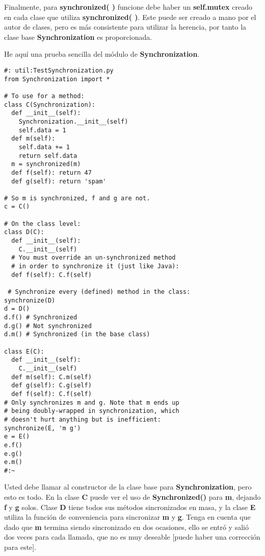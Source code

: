Finalmente, para \textbf{synchronized( )} funcione debe haber un \textbf{self.mutex} creado en cada clase que utiliza \textbf{synchronized( )}. Este puede ser creado a mano por el autor de clases, pero es más consistente para utilizar la herencia, por tanto la clase base \textbf{Synchronization} es proporcionada.  \newline

He aquí una prueba sencilla del módulo de \textbf{Synchronization}. \newline

\begin{lstlisting} 
#: util:TestSynchronization.py 
from Synchronization import *  

# To use for a method: 
class C(Synchronization): 
  def __init__(self): 
    Synchronization.__init__(self) 
    self.data = 1 
  def m(self): 
    self.data += 1 
    return self.data 
  m = synchronized(m) 
  def f(self): return 47 
  def g(self): return 'spam'
  
# So m is synchronized, f and g are not. 
c = C() 

# On the class level: 
class D(C): 
  def __init__(self): 
    C.__init__(self) 
  # You must override an un-synchronized method 
  # in order to synchronize it (just like Java): 
  def f(self): C.f(self) 
  
 # Synchronize every (defined) method in the class: 
synchronize(D) 
d = D() 
d.f() # Synchronized 
d.g() # Not synchronized 
d.m() # Synchronized (in the base class) 

class E(C): 
  def __init__(self): 
    C.__init__(self) 
  def m(self): C.m(self) 
  def g(self): C.g(self) 
  def f(self): C.f(self) 
# Only synchronizes m and g. Note that m ends up 
# being doubly-wrapped in synchronization, which 
# doesn't hurt anything but is inefficient: 
synchronize(E, 'm g') 
e = E() 
e.f() 
e.g() 
e.m() 
#:~
\end{lstlisting}

Usted debe llamar al constructor de la clase base para \textbf{Synchronization}, pero esto es todo. En la clase \textbf{C} puede ver el uso de \textbf{Synchronized()} para \textbf{m}, dejando \textbf{f} y \textbf{g} solos. Clase \textbf{D} tiene todos sus métodos sincronizados en masa, y la clase \textbf{E} utiliza la función de conveniencia para sincronizar \textbf{m} y \textbf{g}. Tenga en cuenta que dado que \textbf{m} termina siendo sincronizado en dos ocasiones, ello se entró y salió dos veces para cada llamada, que no es muy deseable [puede haber una corrección para este].     \newline
      
